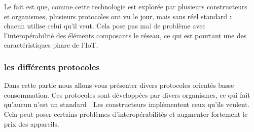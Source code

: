 Le fait est que, comme cette technologie est explorée par plusieurs constructeurs et organismes, plusieurs protocoles ont vu le jour, mais sans réel standard : chacun utilise celui qu'il veut. Cela pose pas mal de problème avec l'interopérabilité des éléments composants le réseau, ce qui est pourtant une des caractéristiques phare de l'IoT.

\subsubsection{les différents protocoles}

Dans cette partie nous allons vous présenter divers protocoles orientés basse consommation. Ces protocoles sont développées par divers organismes, ce qui fait qu'aucun n'est un standard . Les constructeurs implémentent ceux qu’ils veulent. Cela peut poser certains problèmes d'interopérabilités et augmenter fortement le prix des appareils.

